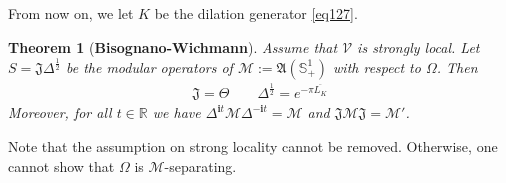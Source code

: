 \documentclass[12pt,b5paper,notitlepage]{article}
\theoremstyle{definition}
\theoremstyle{plain}
\newtheorem{thm}[df]{Theorem}
\newcommand{\fk}{\mathfrak}
\newcommand{\mc}{\mathcal}
\newcommand{\ovl}{\overline}
\newcommand{\im}{\mathbf{i}}
\newcommand{\Rbb}{\mathbb R}
\newcommand{\Sbb}{{\mathbb S}}
\newcommand{\MV}{\mathcal V}
\numberwithin{equation}{section}
\begin{document}
\subsection{}

From now on, we let $K$ be the dilation generator \eqref{eq127}.


\begin{thm}[\textbf{Bisognano-Wichmann}]\label{lb102}
Assume that $\MV$ is strongly local. Let $S=\fk J\Delta^{\frac 12}$ be the modular operators of $\mc M:=\fk A(\Sbb^1_+)$ with respect to $\Omega$. Then
\begin{align}\label{eq129}
\fk J=\Theta\qquad \Delta^{\frac 12}=e^{-\pi \ovl{L_K}}
\end{align}
Moreover, for all $t\in\Rbb$ we have $\Delta^{\im t}\mc M\Delta^{-\im t}=\mc M$ and $\fk J\mc M\fk J=\mc M'$.
\end{thm}

Note that the assumption on strong locality cannot be removed. Otherwise, one cannot show that $\Omega$ is $\mc M$-separating.
\end{document}
